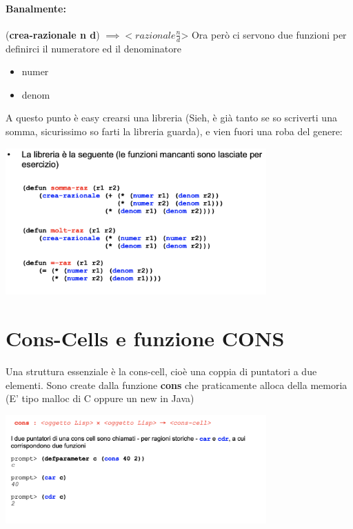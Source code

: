 \documentclass[12pt, a4paper, openany, oneside]{book}
\begin{document}
\paragraph{Banalmente: } (\textbf{crea-razionale n d}) $\implies <razionale \frac{n}{d}$>
Ora però ci servono due funzioni per definirci il numeratore ed il denominatore
\begin{itemize}
	\item numer
	\item denom
\end{itemize}
A questo punto è easy crearsi una libreria (Sieh, è già tanto se so scriverti 
una somma, sicurissimo so farti la libreria guarda), e vien fuori una roba del 
genere:
\begin{center}
\includegraphics[width=0.75\textwidth]{14}
\end{center}
\section{Cons-Cells e funzione CONS}
Una struttura essenziale è la cons-cell, cioè una coppia di puntatori a due 
elementi.
Sono create dalla funzione \textbf{cons} che praticamente alloca della memoria 
(E' tipo malloc di C oppure un new in Java) 
\begin{center}
\includegraphics[width=0.75\textwidth]{15}
\end{center}
\end{document}
